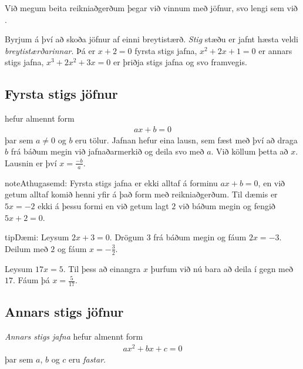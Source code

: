 \documentclass[a4paper,10pt,icelandic]{sphinxmanual}
\begin{document}
Við megum beita reikniaðgerðum þegar við vinnum með jöfnur, svo lengi sem við .

Byrjum á því að skoða jöfnur af einni breytistærð. \textit{Stig} stæðu er jafnt hæsta veldi \textit{breytistærðarinnar}. Þá er \(x+2=0\) fyrsta stigs jafna, \(x^2+2x+1=0\) er annars stigs jafna, \(x^3+2x^2+3x=0\) er þriðja stigs jafna og svo framvegis.


\subsection{Fyrsta stigs jöfnur}
\label{\detokenize{Kafli02:fyrsta-stigs-jofnur}}
 hefur almennt form
\begin{equation*}
\begin{split}ax+b=0\end{split}
\end{equation*}
þar sem \(a \neq 0\) og \(b\) eru tölur. Jafnan hefur eina lausn, sem fæst með því að draga \(b\) frá báðum megin við jafnaðarmerkið og deila svo með \(a\). Við köllum þetta að  \(x\). Lausnin er því \(x=\frac{-b}{a}\).

\begin{sphinxadmonition}{note}{Athugasemd:}
Fyrsta stigs jafna er ekki alltaf á forminu \(ax+b=0\), en við getum alltaf komið henni yfir á það form með reikniaðgerðum. Til dæmis er \(5x=-2\) ekki á þessu formi en við getum lagt \(2\) við báðum megin og fengið \(5x+2=0\).
\end{sphinxadmonition}

\begin{sphinxadmonition}{tip}{Dæmi:}
 Leysum \(2x+3=0\). Drögum \(3\) frá báðum megin og fáum \(2x=-3\). Deilum með \(2\) og fáum \(x=-\frac{3}{2}\).

 Leysum \(17x=5\). Til þess að einangra \(x\) þurfum við nú bara að deila í gegn með \(17\). Fáum þá \(x=\frac{5}{17}\).
\end{sphinxadmonition}


\subsection{Annars stigs jöfnur}
\label{\detokenize{Kafli02:annars-stigs-jofnur}}\label{\detokenize{Kafli02:s-annars-stigs-jofnur}}
\textit{Annars stigs jafna} hefur almennt form
\begin{equation*}
\begin{split}ax^2+bx+c=0\end{split}
\end{equation*}
þar sem \(a\), \(b\) og \(c\) eru \textit{fastar}.
\end{document}
